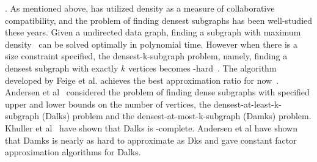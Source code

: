 {.
As mentioned above, \cite{GajewarS12} has utilized density as a measure of collaborative compatibility, and the problem of finding densest subgraphs has been well-studied these years. Given a undirected data graph, finding a subgraph with maximum density~\cite{Goldberg84} can be solved optimally in polynomial time. However when there is a size constraint specified, the densest-k-subgraph problem, namely, finding a densest subgraph with exactly $k$ vertices becomes \NP-hard~\cite{FeigeML01,FeigePK01}. The algorithm developed by Feige et al. achieves the best approximation ratio for now~\cite{FeigePK01}. Andersen et al~\cite{Andersen09} considered the problem of finding dense subgraphs with specified upper and lower bounds on the number of vertices, the densest-at-least-k-subgraph (Dalks) problem and the densest-at-most-k-subgraph (Damks) problem. Khuller et al~\cite{Khuller09} have shown that Dalks is \NP-complete. Andersen et al have shown that Damks is nearly as hard to approximate as Dks and gave constant factor approximation algorithms for Dalks.

}
